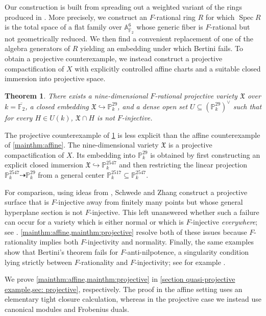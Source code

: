 \documentclass[reqno,11pt]{amsart}
\numberwithin{equation}{section}
\newtheorem{Theoremx}{Theorem}
\theoremstyle{definition}
\theoremstyle{definition}
\theoremstyle{definition}
\theoremstyle{remark}
\newcommand{\Spec}{\operatorname{Spec}}
\newcommand{\F}{\mathbb{F}}
\newcommand{\PP}{\mathbb{P}}
\newcommand{\A}{\mathbb{A}}
\begin{document}
Our construction is built from spreading out a weighted variant of the rings produced in \cite{QGSS24}. More precisely, we construct an $F$-rational ring $R$ for which $\Spec R$ is the total space of a flat family over $\A^6_{\overline{\F}_2}$ whose generic fiber is $F$-rational but not geometrically reduced. We then find a convenient replacement of one of the algebra generators of $R$ yielding an embedding under which Bertini fails. To obtain a projective counterexample, we instead construct a projective compactification of $X$ with explicitly controlled affine charts and a suitable closed immersion into projective space.

\begin{Theoremx}\label{mainthm:projective}
    There exists a nine-dimensional $F$-rational projective variety $\mathfrak{X}$ over $k=\overline{\F_2}$, a closed embedding $\mathfrak{X}\hookrightarrow \PP^{29}_k$, and a dense open set $U\subseteq \left(\PP^{29}_k\right)^{\vee}$ such that for every $H\in U(k)$, $\mathfrak{X}\cap H$ is not $F$-injective.
\end{Theoremx}

The projective counterexample of \cref{mainthm:projective} is less explicit than the affine counterexample of \cref{mainthm:affine}. The nine-dimensional variety $\mathfrak{X}$ is a projective compactification of $X$. Its embedding into $\PP^{29}_k$ is obtained by first constructing an explicit closed immersion $\mathfrak{X}\hookrightarrow\PP^{2547}_k$ and then
restricting the linear projection $\PP^{2547}_k\dashrightarrow\PP^{29}_k$ from a general center $\PP^{2517}_k\subseteq\PP^{2547}_k$.

For comparison, using ideas from \cite{CGM89}, Schwede and Zhang construct a projective surface that is $F$-injective away from finitely many points but whose general hyperplane section is not $F$-injective. This left unanswered whether such a failure can occur for a variety which is either normal or which is $F$-injective \emph{everywhere}; see \cite[Remark 7.6 and Question 8.1]{SZ13}. \cref{mainthm:affine,mainthm:projective} resolve both of these issues because $F$-rationality implies both $F$-injectivity and normality. Finally, the same examples show that Bertini's theorem fails for $F$-anti-nilpotence, a singularity condition lying strictly between $F$-rationality and $F$-injectivity; see for example \cite{EH08,MQ18}.

We prove \cref{mainthm:affine,mainthm:projective} in \cref{section quasi-projective example,sec: projective}, respectively. The proof in the affine setting uses an elementary tight closure calculation, whereas in the projective case we instead use canonical modules and Frobenius duals.
\end{document}
